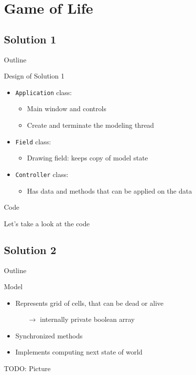 \section{Game of Life}

\subsection{Solution 1}

\begin{frame}{Outline}
  \tableofcontents[current]
\end{frame}

\begin{frame}{Design of Solution 1}
  \begin{itemize}
  \item \lstinline!Application! class:
    \begin{itemize}
    \item Main window and controls
    \item Create and terminate the modeling thread
    \end{itemize}
  \item \lstinline!Field! class:
    \begin{itemize}
    \item Drawing field: keeps copy of model state
    \end{itemize}
  \item \lstinline!Controller! class:
    \begin{itemize}
    \item Has data and methods that can be applied on the data
    \end{itemize}
  \end{itemize}
\end{frame}

\begin{frame}{Code}
  \begin{center}
    {\huge Let's take a look at the code}
  \end{center}
\end{frame}

\subsection{Solution 2}

\begin{frame}{Outline}
  \tableofcontents[current]
\end{frame}

\begin{frame}{Model}
  \begin{itemize}
  \item Represents grid of cells, that can be dead or alive
    \begin{itemize}
    \item[$\rightarrow$] internally private boolean array
    \end{itemize}
  \item Synchronized methods
  \item Implements computing next state of world
  \end{itemize}

  TODO: Picture
\end{frame}

